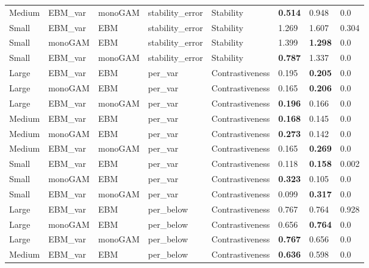 \begin{table}[]
{\begin{tabular}{@{}llllllll@{}}
Medium & EBM\_var & monoGAM & stability\_error  & Stability          & \textbf{0.514} & 0.948          & 0.0   \\
Small  & EBM\_var & EBM     & stability\_error  & Stability          & 1.269          & 1.607          & 0.304 \\
Small  & monoGAM        & EBM     & stability\_error  & Stability          & 1.399          & \textbf{1.298} & 0.0   \\
Small  & EBM\_var & monoGAM & stability\_error  & Stability          & \textbf{0.787} & 1.337          & 0.0   \\
Large  & EBM\_var & EBM     & per\_var          & Contrastiveness    & 0.195          & \textbf{0.205} & 0.0   \\
Large  & monoGAM        & EBM     & per\_var          & Contrastiveness    & 0.165          & \textbf{0.206} & 0.0   \\
Large  & EBM\_var & monoGAM & per\_var          & Contrastiveness    & \textbf{0.196} & 0.166          & 0.0   \\
Medium & EBM\_var & EBM     & per\_var          & Contrastiveness    & \textbf{0.168} & 0.145          & 0.0   \\
Medium & monoGAM        & EBM     & per\_var          & Contrastiveness    & \textbf{0.273} & 0.142          & 0.0   \\
Medium & EBM\_var & monoGAM & per\_var          & Contrastiveness    & 0.165          & \textbf{0.269} & 0.0   \\
Small  & EBM\_var & EBM     & per\_var          & Contrastiveness    & 0.118          & \textbf{0.158} & 0.002 \\
Small  & monoGAM        & EBM     & per\_var          & Contrastiveness    & \textbf{0.323} & 0.105          & 0.0   \\
Small  & EBM\_var & monoGAM & per\_var          & Contrastiveness    & 0.099          & \textbf{0.317} & 0.0   \\
Large  & EBM\_var & EBM     & per\_below        & Contrastiveness    & 0.767          & 0.764          & 0.928 \\
Large  & monoGAM        & EBM     & per\_below        & Contrastiveness    & 0.656          & \textbf{0.764} & 0.0   \\
Large  & EBM\_var & monoGAM & per\_below        & Contrastiveness    & \textbf{0.767} & 0.656          & 0.0   \\
Medium & EBM\_var & EBM     & per\_below        & Contrastiveness    & \textbf{0.636} & 0.598          & 0.0   \\

\end{tabular}}
\end{table}
